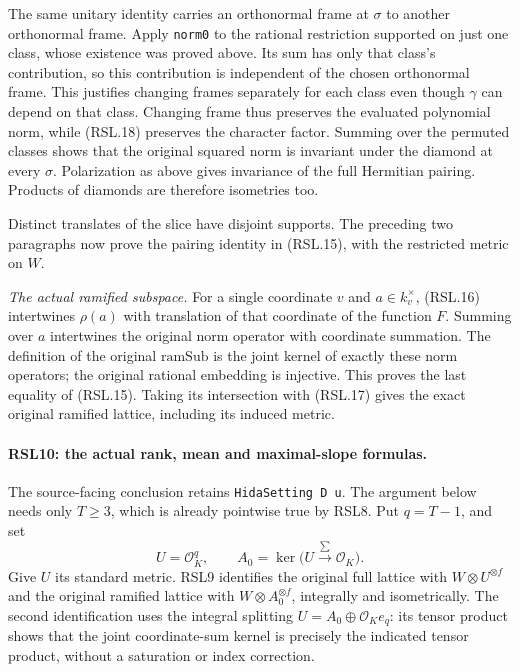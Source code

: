 The same unitary identity carries an orthonormal frame at
$\sigma$ to another orthonormal frame.  Apply \texttt{norm0}
to the rational restriction supported on just one class,
whose existence was proved above.  Its sum has only that
class's contribution, so this contribution is independent of
the chosen orthonormal frame.  This justifies changing frames
separately for each class even though $\gamma$ can depend on
that class.  Changing frame thus preserves the evaluated
polynomial norm, while (RSL.18) preserves the character
factor.  Summing over the permuted classes
shows that the original squared norm is invariant under the
diamond at every $\sigma$.  Polarization as above gives
invariance of the full Hermitian pairing.  Products of diamonds
are therefore isometries too.

Distinct translates of the slice have disjoint supports.  The
preceding two paragraphs now prove the pairing identity in
(RSL.15), with the restricted metric on $W$.

\emph{The actual ramified subspace.}
For a single coordinate $v$ and $a\in k_v^\times$, (RSL.16)
intertwines $\rho(a)$ with translation of that coordinate of
the function $F$.  Summing over $a$ intertwines the original
norm operator with coordinate summation.  The definition of
the original $\mathrm{ramSub}$ is the joint kernel of exactly
these norm operators; the original rational embedding is
injective.  This proves the last equality of (RSL.15).
Taking its intersection with (RSL.17) gives the exact original
ramified lattice, including its induced metric.

\paragraph{RSL10: the actual rank, mean and maximal-slope formulas.}
\label{claim:RSL10}
The source-facing conclusion retains
\texttt{HidaSetting D u}.  The argument below needs only
$T\ge3$, which is already pointwise true by RSL8.
Put $q=T-1$, and set
\[
 U=\mathcal O_K^{q},\qquad
 A_0=\ker\bigl(U\xrightarrow{\sum}\mathcal O_K\bigr).
\]
Give $U$ its standard metric.  RSL9 identifies the original
full lattice with $W\otimes U^{\otimes f}$ and the original
ramified lattice with $W\otimes A_0^{\otimes f}$,
integrally and isometrically.  The second identification uses
the integral splitting
$U=A_0\oplus\mathcal O_K e_q$: its tensor product shows that
the joint coordinate-sum kernel is precisely the indicated
tensor product, without a saturation or index correction.

